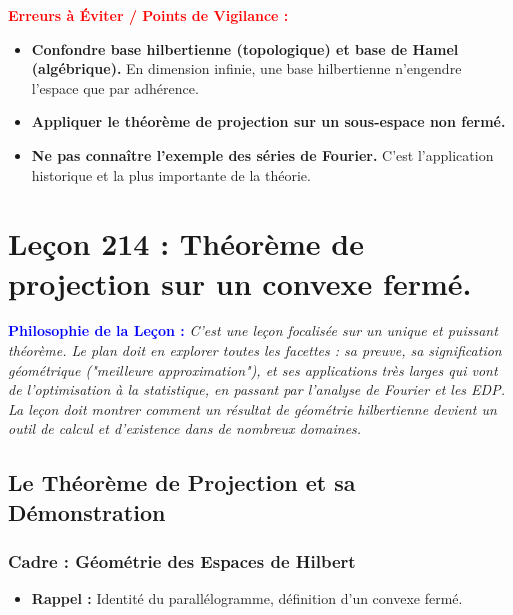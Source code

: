 \documentclass[12pt, a4paper, parskip=full]{report}
\theoremstyle{agregstyle}
\newenvironment{philosophie}
  {\par\medskip\noindent\begin{oframed}\noindent\textbf{\textcolor{blue}{Philosophie de la Leçon :}}\itshape}
  {\end{oframed}\par\medskip}
\newenvironment{erreurs}
  {\par\medskip\noindent\begin{oframed}\noindent\textbf{\textcolor{red}{Erreurs à Éviter / Points de Vigilance :}}}
  {\end{oframed}\par\medskip}
\begin{document}
\begin{erreurs}
    \begin{itemize}
        \item \textbf{Confondre base hilbertienne (topologique) et base de Hamel (algébrique).} En dimension infinie, une base hilbertienne n'engendre l'espace que par adhérence.
        \item \textbf{Appliquer le théorème de projection sur un sous-espace non fermé.}
        \item \textbf{Ne pas connaître l'exemple des séries de Fourier.} C'est l'application historique et la plus importante de la théorie.
    \end{itemize}
\end{erreurs}
\chapter{Leçon 214 : Théorème de projection sur un convexe fermé.}

\begin{philosophie}
    C'est une leçon focalisée sur un unique et puissant théorème. Le plan doit en explorer toutes les facettes : sa preuve, sa signification géométrique ("meilleure approximation"), et ses applications très larges qui vont de l'optimisation à la statistique, en passant par l'analyse de Fourier et les EDP. La leçon doit montrer comment un résultat de géométrie hilbertienne devient un outil de calcul et d'existence dans de nombreux domaines.
\end{philosophie}

\section{Le Théorème de Projection et sa Démonstration}
\subsection{Cadre : Géométrie des Espaces de Hilbert}
\begin{itemize}
    \item \textbf{Rappel :} Identité du parallélogramme, définition d'un convexe fermé.
\end{itemize}
\end{document}
